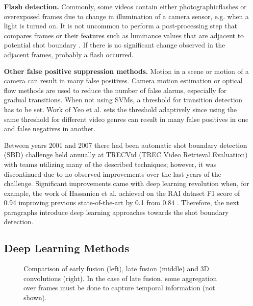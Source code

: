 \begin{description}[labelwidth=1em, leftmargin=!]
    \item \textbf{Flash detection.} Commonly, some videos contain either photographic\linebreak[4] flashes or overexposed frames due to change in illumination of a camera sensor, e.g. when a light is turned on. It is not uncommon to perform a post-processing step that compares frames or their features such as luminance values that are adjacent to potential shot boundary \cite{kawai2007shot}. If there is no significant change observed in the adjacent frames, probably a flash occurred.

    \item \textbf{Other false positive suppression methods.} Motion in a scene or motion of a camera can result in many false positives. Camera motion estimation \cite{muhling2007university} or optical flow \cite{ayache2006clips} methods are used to reduce the number of false alarms, especially for gradual transitions. When not using SVMs, a threshold for transition detection has to be set. Work of Yeo et al. \cite{Yeo1995Rapid} sets the threshold adaptively since using the same threshold for different video genres can result in many false positives in one and false negatives in another.
\end{description}

Between years 2001 and 2007 there had been automatic shot boundary detection (SBD) challenge held annually at TRECVid (TREC Video Retrieval Evaluation) \cite{SevenyearsofTRECVid} with teams utilizing many of the described techniques; however, it was discontinued due to no observed improvements over the last years of the challenge. Significant improvements came with deep learning revolution when, for example, the work of Hassanien et al. \cite{Hassanien17} achieved on the RAI dataset F1 score of 0.94 improving previous state-of-the-art by 0.1 from 0.84 \cite{Baraldi15,apostolidis14}. Therefore, the next paragraphs introduce deep learning approaches towards the shot boundary detection.

\subsection{Deep Learning Methods}

\begin{figure}[h]
    \centering
    \hspace{10pt}
    
    
    \caption[Comparison of early fusion, late fusion and 3D convolutions]{Comparison of early fusion (left), late fusion (middle) and 3D convolutions (right). In the case of late fusion, some aggregation over frames must be done to capture temporal information (not shown).}
    \label{fig:3dFusionApproches}
\end{figure}


